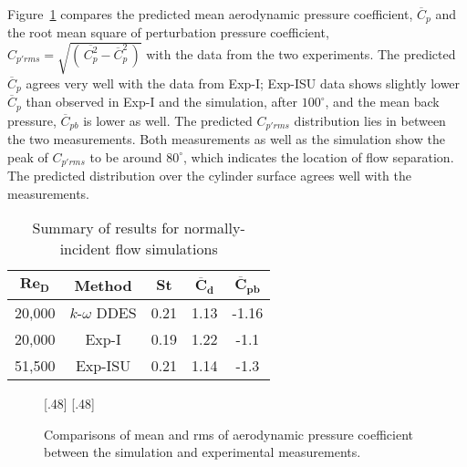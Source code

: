 Figure~\ref{fig:Cp_compared_Re20k} compares the predicted mean aerodynamic
pressure coefficient, $\overline{C}_p$ and the root mean square of perturbation
pressure coefficient, $C_{p'rms} = \sqrt{(\,\overline{C^2_p} -
\overline{C}^2_p\,)}$ with the data from the two experiments. The predicted
$\overline{C}_p$ agrees very well with the data from Exp-I; Exp-ISU data shows
slightly lower $\overline{C}_p$ than observed in Exp-I and the simulation,
after $100^\circ$, and the mean back pressure, $\overline{C}_{pb}$ is lower as
well. The predicted $C_{p'rms}$ distribution lies in between the two
measurements. Both measurements as well as the simulation show the peak of
$C_{p'rms}$ to be around $80^\circ$, which indicates the location of flow
separation. The predicted distribution over the cylinder surface agrees well
with the measurements.
%
\begin{table}[htb!]
  \caption{Summary of results for normally-incident flow simulations} 
  \label{tab:comparisonRe20k} 
  \begin{center}
  \begin{tabular}{c|c|c|c|c}
      $\boldsymbol{Re_D}$ & \textbf{Method} & $\boldsymbol{St}$ & $\boldsymbol{\overline{C}_d}$ & $\boldsymbol{\overline{C}_{pb}}$ \\ \hline
      \hline
      20,000 & $k$-$\omega$ DDES & 0.21 & 1.13 & -1.16 \\ \hline
      20,000 & Exp-I    & 0.19 & 1.22 & -1.1  \\ \hline
      51,500 & Exp-ISU         & 0.21 & 1.14 & -1.3  \\ \hline
      \hline
  \end{tabular}
  \end{center}
\end {table}

\begin{figure}[htb!]
  \centering
    [.48\linewidth]{}
  \hspace*{\fill}
    [.48\linewidth]{}
  \caption{Comparisons of mean and rms of aerodynamic pressure coefficient
  between the simulation and experimental measurements.}
  \label{fig:Cp_compared_Re20k}
\end{figure}

